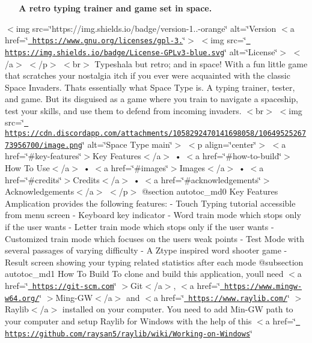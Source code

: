 ~\newline
    ~\newline
 {\bfseries{A retro typing trainer and game set in space.}} ~\newline
  ~\newline
 ~\newline
 

   \texorpdfstring{$<$}{<}img src=\char`\"{}https\+://img.\+shields.\+io/badge/version-\/1..-\/orange\char`\"{} alt=\char`\"{}\+Version   $<$a href=\char`\"{}\href{https://www.gnu.org/licenses/gpl-3.0}{\texttt{ https\+://www.\+gnu.\+org/licenses/gpl-\/3.}}\char`\"{}$>$     $<$img src=\char`\"{}\href{https://img.shields.io/badge/License-GPLv3-blue.svg}{\texttt{ https\+://img.\+shields.\+io/badge/\+License-\/\+GPLv3-\/blue.\+svg}}\char`\"{} alt=\char`\"{}License\char`\"{}$>$   $<$/a$>$ $<$/p$>$  $<$br$>$   \+Typeshala but retro; and in space! With a fun little game that scratches your nostalgia itch if you ever were acquainted with the classic Space Invaders.  \+That\textquotesingle{}s essentially what Space Type is.   \+A typing trainer, tester, and game. But it\textquotesingle{}s disguised as a game where you train to navigate a spaceship, test your skills, and use them to defend from incoming invaders.  $<$br$>$  $<$img src=\char`\"{}\href{https://cdn.discordapp.com/attachments/1058292470141698058/1064952526773956700/image.png}{\texttt{ https\+://cdn.\+discordapp.\+com/attachments/1058292470141698058/1064952526773956700/image.\+png}}\char`\"{} alt=\char`\"{}Space Type main\char`\"{}$>$  $<$p align=\char`\"{}center\char`\"{}$>$   $<$a href=\char`\"{}\#key-\/features\char`\"{}$>$\+Key Features$<$/a$>$ •   $<$a href=\char`\"{}\#how-\/to-\/build\char`\"{}$>$\+How To Use$<$/a$>$ •   $<$a href=\char`\"{}\#images\char`\"{}$>$\+Images$<$/a$>$ •   $<$a href=\char`\"{}\#credits\char`\"{}$>$\+Credits$<$/a$>$ •   $<$a href=\char`\"{}\#acknowledgements\char`\"{}$>$\+Acknowledgements$<$/a$>$ $<$/p$>$   @section autotoc\+\_\+md0 Key Features  \+Amplication provides the following features\+:  -\/ Touch Typing tutorial accessible from menu screen -\/ Keyboard key indicator -\/ Word train mode which stops only if the user wants -\/ Letter train mode which stops only if the user wants -\/ Customized train mode which focuses on the user\textquotesingle{}s weak points -\/ Test Mode with several passages of varying difficulty -\/ A Ztype inspired word shooter game -\/ Result screen showing your typing related statistics after each mode   @subsection autotoc\+\_\+md1 How To Build  \+To clone and build this application, you\textquotesingle{}ll need $<$a href=\char`\"{}\href{https://git-scm.com}{\texttt{ https\+://git-\/scm.\+com}}\char`\"{} $>$\+Git$<$/a$>$, $<$a href=\char`\"{}\href{https://www.mingw-w64.org/}{\texttt{ https\+://www.\+mingw-\/w64.\+org/}}\char`\"{} $>$\+Ming-\/\+GW$<$/a$>$ and $<$a href=\char`\"{}\href{https://www.raylib.com/}{\texttt{ https\+://www.\+raylib.\+com/}}\char`\"{} $>$\+Raylib$<$/a$>$ installed on your computer. You need to add Min-\/\+GW path to your computer and setup Raylib for Windows with the help of this $<$a href=\char`\"{}\href{https://github.com/raysan5/raylib/wiki/Working-on-Windows}{\texttt{ https\+://github.\+com/raysan5/raylib/wiki/\+Working-\/on-\/\+Windows}}\char`\"{} 